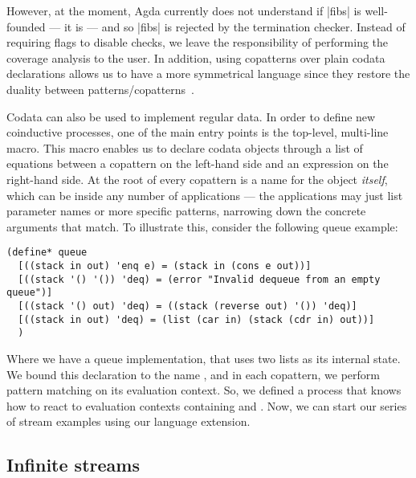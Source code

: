 However, at the moment, Agda currently does not understand if \agda|fibs| is well-founded --- it is --- and so \agda|fibs| is rejected by the termination checker.
Instead of requiring flags to disable checks, we leave the responsibility of performing the coverage analysis to the user.
In addition, using copatterns over plain codata declarations allows us to have a more symmetrical language since they restore the duality between patterns/copatterns~\cite{APTS2013C}.

Codata can also be used to implement regular data.
In order to define new coinductive processes, one of the main entry points is the top-level, multi-line  macro.
This macro enables us to declare codata objects through a list of equations between a copattern on the left-hand side and an expression on the right-hand side.
At the root of every copattern is a name for the object \emph{itself}, which can be inside any number of applications --- the applications may just list parameter names or more specific patterns, narrowing down the concrete arguments that match.
To illustrate this, consider the following queue example:
\begin{verbatim}
(define* queue
  [((stack in out) 'enq e) = (stack in (cons e out))]
  [((stack '() '()) 'deq) = (error "Invalid dequeue from an empty queue")]
  [((stack '() out) 'deq) = ((stack (reverse out) '()) 'deq)]
  [((stack in out) 'deq) = (list (car in) (stack (cdr in) out))]
  )
\end{verbatim}
Where we have a queue implementation, that uses two lists as its internal state.
We bound this declaration to the name , and in each copattern, we perform pattern matching on its evaluation context.
So, we defined a process that knows how to react to evaluation contexts containing  and .
Now, we can start our series of stream examples using our language extension.

\subsection{Infinite streams}

